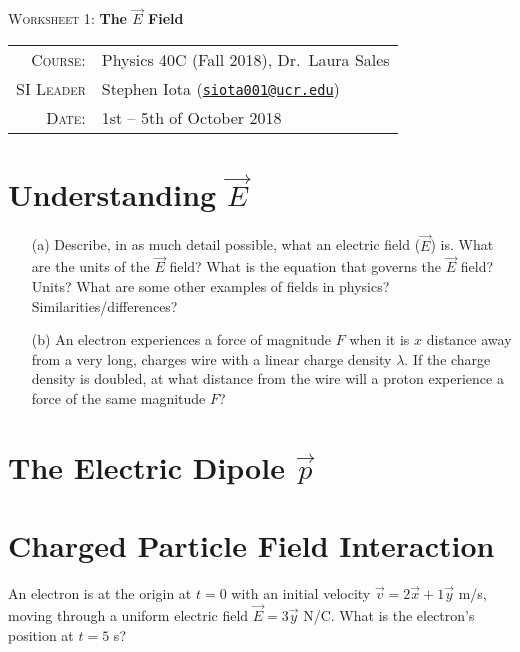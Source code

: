 \documentclass{article}
\newcommand{\email}[1]{\texttt{\href{mailto:#1}{#1}}}
\begin{document}
\begin{center}

\Large{\textsc{Worksheet 1}: \textbf{The $\vec{E}$ Field}}

\end{center}

\vspace{.5mm}


\begin{tabular}{rl}

\textsc{Course}:
&
Physics 40C (Fall 2018), Dr.~Laura Sales
\\
\textsc{SI Leader}
&
Stephen Iota (\email{siota001@ucr.edu})
\\
\textsc{Date}:
&
1st -- 5th of October 2018
\end{tabular}


\section{Understanding $\vec{E}$}

\begin{enumerate}

\item[(a)] Describe, in as much detail possible, what an electric field ($\vec{E}$) is. What are the units of the $\vec{E}$ field? What is the equation that governs the $\vec{E}$ field? Units?  What are some other examples of fields in physics? Similarities/differences? 






\item[(b)] An electron experiences a force of magnitude $F$ when it is $x$ distance away from a very long, charges wire with a linear charge density $\lambda$. If the charge density is doubled, at what distance from the wire will a proton experience a force of the same magnitude $F$? 

\end{enumerate}

\section{The Electric Dipole $\vec{p}$} 



\section{Charged Particle Field Interaction}

An electron is at the origin at $t = 0$ with an initial velocity $\vec{v} = 2\vec{x} + 1\vec{y}$ m/s, moving through a uniform electric field $\vec{E} = 3\vec{y}$ N/C. What is the electron's position at $t = 5$ s? 
\end{document}
